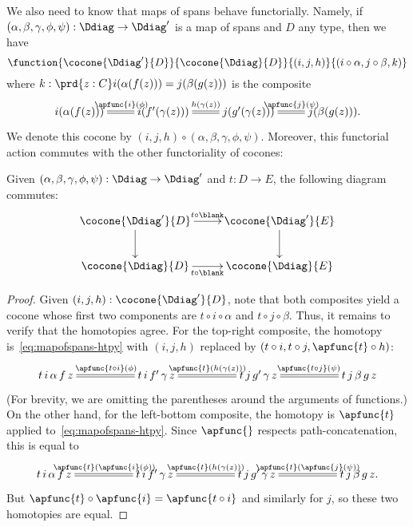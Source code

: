 We also need to know that maps of spans behave functorially.
Namely, if $(\alpha,\beta,\gamma,\phi,\psi):\Ddiag \to \Ddiag'$ is a map of spans and $D$ any type, then we have
\[ \function{\cocone{\Ddiag'}{D}}{\cocone{\Ddiag}{D}}{(i,j,h)}{(i\circ \alpha,j\circ\beta, k)} \]
where $k: \prd{z:C} i(\alpha(f(z))) = j(\beta(g(z)))$ is the composite
\begin{equation}\label{eq:mapofspans-htpy}
\xymatrix{
  i(\alpha(f(z))) \ar@{=}[r]^{\apfunc{i}(\phi)} &
  i(f'(\gamma(z))) \ar@{=}[r]^{h(\gamma(z))} &
  j(g'(\gamma(z))) \ar@{=}[r]^{\apfunc{j}(\psi)} &
  j(\beta(g(z))). }
\end{equation}
We denote this cocone by $(i,j,h) \circ (\alpha,\beta,\gamma,\phi,\psi)$.
Moreover, this functorial action commutes with the other functoriality of cocones:

\begin{lem}\label{thm:conemap-funct}
  Given $(\alpha,\beta,\gamma,\phi,\psi):\Ddiag \to \Ddiag'$ and $t:D\to E$, the following diagram commutes:
  \begin{equation*}
    \vcenter{\xymatrix{
        \cocone{\Ddiag'}{D}\ar[r]^{t \circ {\blank}}\ar[d] &
        \cocone{\Ddiag'}{E}\ar[d]\\
        \cocone{\Ddiag}{D}\ar[r]_{t \circ {\blank}} &
        \cocone{\Ddiag}{E}
      }}
  \end{equation*}
\end{lem}
\begin{proof}
  Given $(i,j,h):\cocone{\Ddiag'}{D}$, note that both composites yield a cocone whose first two components are $t\circ i\circ \alpha$ and $t\circ j\circ\beta$.
  Thus, it remains to verify that the homotopies agree.
  For the top-right composite, the homotopy is~\eqref{eq:mapofspans-htpy} with $(i,j,h)$ replaced by $(t\circ i, t\circ j, \apfunc{t}\circ h)$:
  \begin{equation*}
    \xymatrix@+2.8em{
      {t \, i \, \alpha \, f \, z} \ar@{=}[r]^{\apfunc{t\circ i}(\phi)} &
      {t \, i \, f' \, \gamma \, z} \ar@{=}[r]^{\apfunc{t}(h(\gamma(z)))} &
      {t \, j \, g' \, \gamma \, z} \ar@{=}[r]^{\apfunc{t\circ j}(\psi)} &
      {t \, j \, \beta \, g \, z}
    }
  \end{equation*}
  (For brevity, we are omitting the parentheses around the arguments of functions.)
  On the other hand, for the left-bottom composite, the homotopy is $\apfunc{t}$ applied to~\eqref{eq:mapofspans-htpy}.
  Since $\apfunc{}$ respects path-concatenation, this is equal to
  \begin{equation*}
    \xymatrix@+2.8em{
      {t \, i \, \alpha \, f \, z} \ar@{=}[r]^{\apfunc{t}(\apfunc{i}(\phi))} &
      {t \, i \, f' \, \gamma \, z} \ar@{=}[r]^{\apfunc{t}(h(\gamma(z)))} &
      {t \, j \, g' \, \gamma \, z} \ar@{=}[r]^{\apfunc{t}(\apfunc{j}(\psi))} &
      {t \, j \, \beta \, g \, z}. }
  \end{equation*}
  But $\apfunc{t}\circ \apfunc{i} = \apfunc{t\circ i}$ and similarly for $j$, so these two homotopies are equal.
\end{proof}

